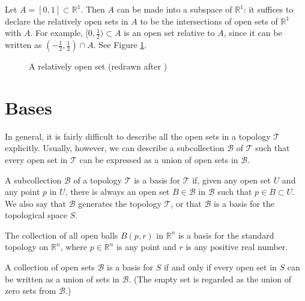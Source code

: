 \begin{example}
	Let $A = [0,1]\subset \mathbb{R}^1$. Then $A$ can be made into a
	subspace of $\mathbb{R}^1$: it suffices to declare the relatively open
	sets in $A$ to be the intersections of open sets of $\mathbb{R}^1$ with
	$A$. For example, $[0,\frac12)\subset A$ is an open set relative to $A$,
	since it can be written as $(-\frac12,\frac12)\cap A$. See Figure
	\ref{fig:relative_open}.
	\begin{figure}[!ht]
		\centering
    \caption{A relatively open set (redrawn after
			\cite{tu_introduction_2011})}
		\label{fig:relative_open}
	\end{figure}
\end{example}







\section{Bases}

In general, it is fairly difficult to describe all the open sets in a topology
$\mathcal{T}$ explicitly. Usually, however, we can describe a subcollection
$\mathcal{B}$ of $\mathcal{T}$ such that every open set in $\mathcal{T}$ can
be expressed as a union of open sets in $\mathcal{B}$.

\begin{definition} A subcollection $\mathcal{B}$ of a
	topology $\mathcal{T}$ is a basis for $\mathcal{T}$ if, given any open
	set $U$ and any point $p$ in $U$, there is always an open set
	$B\in\mathcal{B}$ in $\mathcal{B}$ such that $p\in B\subset U$. We also
	say that $\mathcal{B}$ generates the topology $\mathcal{T}$, or that
	$\mathcal{B}$ is a basis for the topological space $S$.

\end{definition}




\begin{example}
	The collection of all open balls $B(p,r)$ in $\mathbb{R}^n$ is a basis
	for the standard topology on $\mathbb{R}^n$, where $p\in\mathbb{R}^n$ is
	any point and $r$ is any positive real number.
\end{example}



\begin{proposition} A collection of open sets $\mathcal{B}$ is a basis for $S$
	if and only if every open set in $S$ can be written as a union of sets in
	$\mathcal{B}$. (The empty set is regarded as the union of zero sets from
	$\mathcal{B}$.)
\end{proposition}

